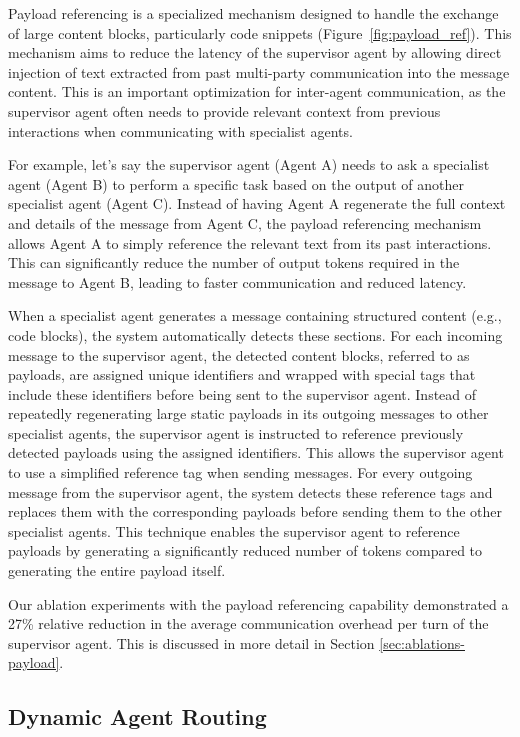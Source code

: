 Payload referencing is a specialized mechanism designed to handle the exchange of large content blocks, particularly code snippets (Figure~\ref{fig:payload_ref}). This mechanism aims to reduce the latency of the supervisor agent by allowing direct injection of text extracted from past multi-party communication into the message content. This is an important optimization for inter-agent communication, as the supervisor agent often needs to provide relevant context from previous interactions when communicating with specialist agents.

For example, let's say the supervisor agent (Agent A) needs to ask a specialist agent (Agent B) to perform a specific task based on the output of another specialist agent (Agent C). Instead of having Agent A regenerate the full context and details of the message from Agent C, the payload referencing mechanism allows Agent A to simply reference the relevant text from its past interactions. This can significantly reduce the number of output tokens required in the message to Agent B, leading to faster communication and reduced latency.

When a specialist agent generates a message containing structured content (e.g., code blocks), the system automatically detects these sections. For each incoming message to the supervisor agent, the detected content blocks, referred to as payloads, are assigned unique identifiers and wrapped with special tags that include these identifiers before being sent to the supervisor agent. Instead of repeatedly regenerating large static payloads in its outgoing messages to other specialist agents, the supervisor agent is instructed to reference previously detected payloads using the assigned identifiers. This allows the supervisor agent to use a simplified reference tag when sending messages. For every outgoing message from the supervisor agent, the system detects these reference tags and replaces them with the corresponding payloads before sending them to the other specialist agents. This technique enables the supervisor agent to reference payloads by generating a significantly reduced number of tokens compared to generating the entire payload itself.

Our ablation experiments with the payload referencing capability 
demonstrated a 27\% relative reduction 
in the average communication overhead per turn of the supervisor agent. This is discussed in more detail in Section \ref{sec:ablations-payload}.


\subsection{Dynamic Agent Routing}

